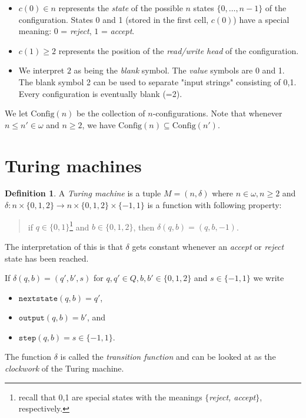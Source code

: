 \documentclass[12pt, a4paper]{amsart}
\theoremstyle{definition}
\newtheorem{definition}[lemma]{Definition}
\newcommand{\C}{\text{Config}}
\begin{document}

\vspace*{1mm}

\begin{itemize}
    \item $c(0)\in n$ represents the {\em state} of the possible $n$ 
        states $\{0,\ldots,n-1\}$ of the configuration. States 0 and 1 
        (stored in the first cell, $c(0)$) have a special meaning: 
        $0$ = {\em reject}, $1$ = {\em accept}.
    \item $c(1) \geq 2$ represents the position of the {\em read/write head}
        of the configuration.
    \item We interpret $2$ as being the {\em blank} symbol. The {\em value} 
        symbols are 0 and 1. The blank symbol 2 can be used to separate "input strings" 
        consisting of 0,1. Every configuration is eventually blank (=2).
\end{itemize}

We let $\C(n)$ be the collection of $n$-configurations. Note that
whenever $n\leq n'\in \omega$ and $n\geq 2$, we have $\C(n)\subseteq \C(n')$.

\section{Turing machines}

\begin{definition}
A {\em Turing machine} is a tuple $M=(n, \delta)$ where $n\in\omega,
    n\geq 2$ and $\delta: n \times \{0,1,2\} \to n \times \{0,1,2\} \times
    \{-1,1\}$ is a function with following property: 
    \begin{quote} if 
    $q \in \{0,1\}$\footnote{recall that 0,1 are special states with 
        the meanings
    $\{${\em reject, accept}$\}$, respectively.}
     and $b\in \{0,1,2\}$, then $\delta(q,b) = (q,b,-1)$.
    \end{quote}
\end{definition}

The interpretation of this is that $\delta$ gets constant
whenever an {\em accept} or {\em reject} state has been reached.

If $\delta(q,b) = (q', b', s)$ for $q,q'\in Q, b,b'\in \{0,1,2\}$ and 
$ s\in \{-1,1\}$
we write
\begin{itemize}
    \item $\mathtt{nextstate}(q,b) = q'$,
    \item $\mathtt{output}(q,b) = b'$, and
    \item $\mathtt{step}(q,b) = s\in\{-1,1\}$. 
\end{itemize}
The function $\delta$ is called the {\em transition function} and can 
be looked at as the {\sl clockwork} of the Turing machine.
\end{document}
